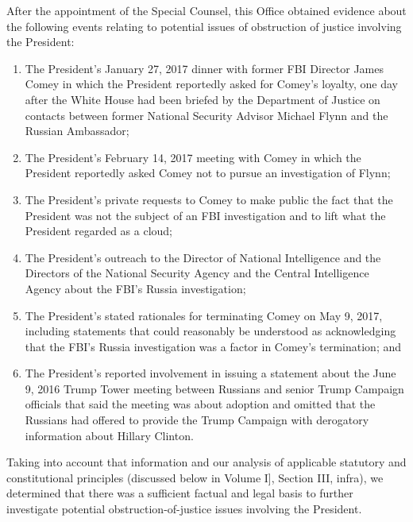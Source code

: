 After the appointment of the Special Counsel, this Office obtained evidence about the following events relating to potential issues of obstruction of justice involving the President:

\begin{enumerate}
    \item The President’s January 27, 2017 dinner with former FBI Director James Comey in which the President reportedly asked for Comey’s loyalty, one day after the White House had been briefed by the Department of Justice on contacts between former National Security Advisor Michael Flynn and the Russian Ambassador;

    \item The President’s February 14, 2017 meeting with Comey in which the President reportedly asked Comey not to pursue an investigation of Flynn;

    \item The President’s private requests to Comey to make public the fact that the President was not the subject of an FBI investigation and to lift what the President regarded as a cloud;

    \item The President’s outreach to the Director of National Intelligence and the Directors of the National Security Agency and the Central Intelligence Agency about the FBI’s Russia investigation;

    \item The President’s stated rationales for terminating Comey on May 9, 2017, including statements that could reasonably be understood as acknowledging that the FBI’s Russia investigation was a factor in Comey’s termination; and

    \item The President’s reported involvement in issuing a statement about the June 9, 2016 Trump Tower meeting between Russians and senior Trump Campaign officials that said the meeting was about adoption and omitted that the Russians had offered to provide the Trump Campaign with derogatory information about Hillary Clinton.
\end{enumerate}

Taking into account that information and our analysis of applicable statutory and constitutional principles (discussed below in Volume I], Section III, infra), we determined that there was a sufficient factual and legal basis to further investigate potential obstruction-of-justice issues involving the President.


